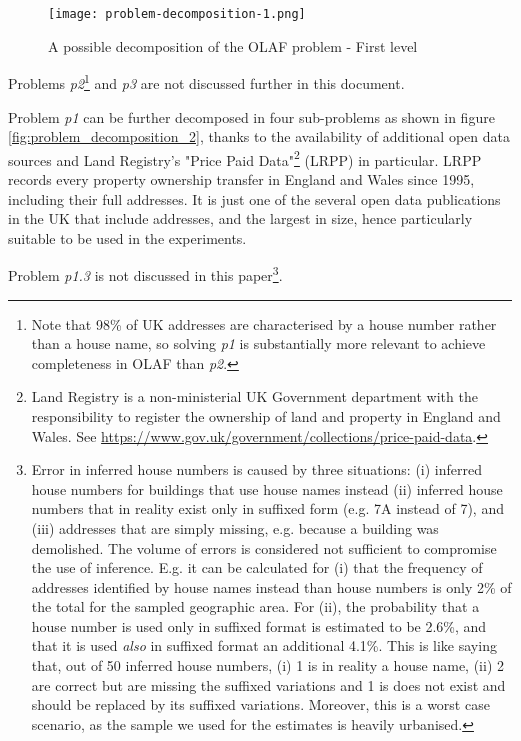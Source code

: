\begin{figure}
	\texttt{[image: problem-decomposition-1.png]}
	\caption{A possible decomposition of the OLAF problem - First level}
	\label{fig:problem_decomposition_1}
\end{figure}

    
Problems {\it p2}\footnote{Note that 98\% of UK addresses are characterised by a house number rather than a house name, so solving {\it p1} is substantially more relevant to achieve completeness in OLAF than {\it p2}.} and {\it p3} are not discussed further in this document. 

Problem {\it p1} can be further decomposed in four sub-problems as shown in figure \ref{fig:problem_decomposition_2}, thanks to the availability of additional open data sources and Land Registry's "Price Paid Data"\footnote{Land Registry is a non-ministerial UK Government department with the responsibility to register the ownership of land and property in England and Wales. See \url{https://www.gov.uk/government/collections/price-paid-data}.} (LRPP) in particular. LRPP records every property ownership transfer in England and Wales since 1995, including their full addresses. It is just one of the several open data publications in the UK that include addresses, and the largest in size, hence particularly suitable to be used in the experiments.
    

Problem {\it p1.3} is not discussed in this paper\footnote{Error in inferred house numbers is caused by three situations: (i) inferred house numbers for buildings that use house names instead (ii) inferred house numbers that in reality exist only in suffixed form (e.g. 7A instead of 7), and (iii) addresses that are simply missing, e.g. because a building was demolished. The volume of errors is considered not sufficient to compromise the use of inference. E.g. it can be calculated for (i) that the frequency of addresses identified by house names instead than house numbers is only 2\% of the total for the sampled geographic area. For (ii), the probability that a house number is used only in suffixed format is estimated to be 2.6\%, and that it is used {\it also} in suffixed format an additional 4.1\%. This is like saying that, out of 50 inferred house numbers, (i) 1 is in reality a house name, (ii) 2 are correct but are missing the suffixed variations and 1 is does not exist and should be replaced by its suffixed variations. Moreover, this is a worst case scenario, as the sample we used for the estimates is heavily urbanised.}.

